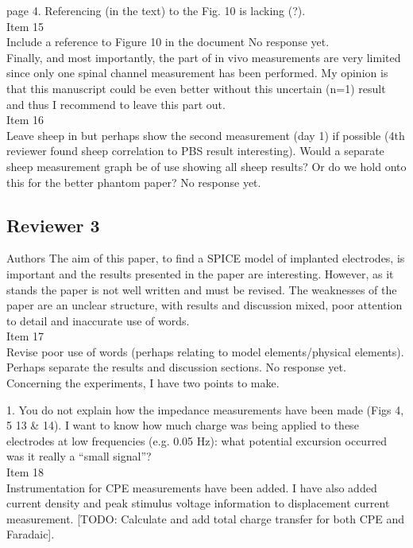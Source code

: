 \documentclass[journal, a4paper]{IEEEtran}
\begin{document}
{{page 4. Referencing (in the text) to the Fig. 10 is lacking (?).\\
{\color{OliveGreen}
    Item 15\\
    {\color{Red} Include a reference to Figure 10 in the document}
    No response yet.
}\\

Finally, and most importantly, the part of in vivo measurements are very limited since only one spinal channel measurement has been performed. My opinion is that this manuscript could be even better without this uncertain (n=1) result and thus I recommend to leave this part out.\\
{\color{OliveGreen}
    Item 16\\ 
    {\color{Red} Leave sheep in but perhaps show the second measurement (day 1) if possible (4th reviewer found sheep correlation to PBS result interesting). Would a separate sheep measurement graph be of use showing all sheep results? Or do we hold onto this for the better phantom paper?}
    No response yet.
}\\
}

\subsection*{Reviewer 3}

{\color{blue}
Authors
The aim of this paper, to find a SPICE model of implanted electrodes, is important and the results presented in the paper are interesting. However, as it stands the paper is not well written and must be revised. The weaknesses of the paper are an unclear structure, with results and discussion mixed, poor attention to detail and inaccurate use of words.\\
{\color{OliveGreen}
    Item 17\\
    {\color{Red} Revise poor use of words (perhaps relating to model elements/physical elements). Perhaps separate the results and discussion sections.} 
    No response yet.
}\\

Concerning the experiments, I have two points to make.

1. You do not explain how the impedance measurements have been made (Figs 4, 5 13 & 14). I want to know how much charge was being applied to these electrodes at low frequencies (e.g. 0.05 Hz): what potential excursion occurred was it really a ``small signal''?\\
{\color{OliveGreen}
    Item 18\\
    Instrumentation for CPE measurements have been added. I have also added current density and peak stimulus voltage information to displacement current measurement. [TODO: Calculate and add total charge transfer for both CPE and Faradaic].
}\\

}}
\end{document}
